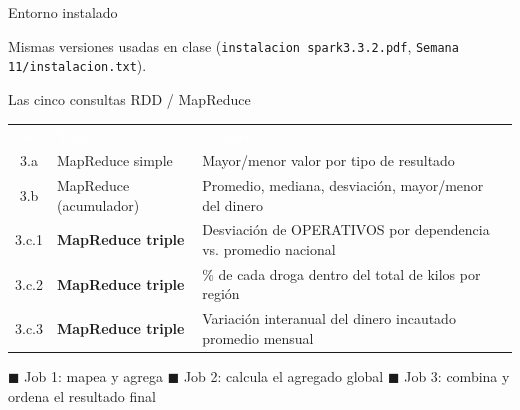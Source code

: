 \documentclass[10pt,aspectratio=169]{beamer}
\begin{document}
\begin{frame}{Entorno instalado}
\centering
{}
\vspace{10pt}

\small Mismas versiones usadas en clase (\texttt{instalacion spark3.3.2.pdf}, \texttt{Semana 11/instalacion.txt}).
\end{frame}

\begin{frame}{Las cinco consultas RDD / MapReduce}
\footnotesize
\begin{tabular}{@{}clp{7.4cm}@{}}
\toprule
\rowcolor{uni} \textcolor{white}{\#} & \textcolor{white}{Tipo} & \textcolor{white}{Pregunta} \\
3.a & MapReduce simple & Mayor/menor valor por tipo de resultado \\
3.b & MapReduce (acumulador) & Promedio, mediana, desviaci\'on, mayor/menor del dinero \\
3.c.1 & \textcolor{job1!80!black}{\textbf{MapReduce triple}} & Desviaci\'on de OPERATIVOS por dependencia vs. promedio nacional \\
3.c.2 & \textcolor{job2!80!black}{\textbf{MapReduce triple}} & \% de cada droga dentro del total de kilos por regi\'on \\
3.c.3 & \textcolor{job3!80!black}{\textbf{MapReduce triple}} & Variaci\'on interanual del dinero incautado promedio mensual \\
\bottomrule
\end{tabular}

\vspace{10pt}
\small \textcolor{job1!80!black}{$\blacksquare$} Job 1: mapea y agrega \quad
\textcolor{job2!80!black}{$\blacksquare$} Job 2: calcula el agregado global \quad
\textcolor{job3!80!black}{$\blacksquare$} Job 3: combina y ordena el resultado final
\end{frame}
\end{document}
